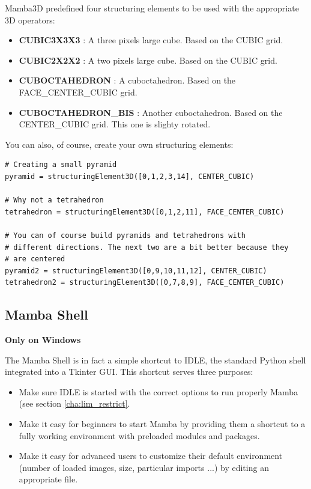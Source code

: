 \documentclass[a4paper,10pt,oneside]{article}
\begin{document}

Mamba3D predefined four structuring elements to be used with the appropriate
3D operators:

\begin{itemize}
\item \textbf{CUBIC3X3X3} : A three pixels large cube. Based on the CUBIC grid.
\item \textbf{CUBIC2X2X2} : A two pixels large cube. Based on the CUBIC grid.
\item \textbf{CUBOCTAHEDRON} : A cuboctahedron. Based on the
FACE\_CENTER\_CUBIC grid.
\item \textbf{CUBOCTAHEDRON\_BIS} : Another cuboctahedron. Based on the
CENTER\_CUBIC grid. This one is slighty rotated.
\end{itemize}

You can also, of course, create your own structuring elements:

\lstset{language=Python}
\begin{lstlisting}
# Creating a small pyramid
pyramid = structuringElement3D([0,1,2,3,14], CENTER_CUBIC)

# Why not a tetrahedron
tetrahedron = structuringElement3D([0,1,2,11], FACE_CENTER_CUBIC)

# You can of course build pyramids and tetrahedrons with
# different directions. The next two are a bit better because they
# are centered
pyramid2 = structuringElement3D([0,9,10,11,12], CENTER_CUBIC)
tetrahedron2 = structuringElement3D([0,7,8,9], FACE_CENTER_CUBIC)
\end{lstlisting}

\subsection{Mamba Shell}
\label{cha:mamba_shell}

\textbf{Only on Windows}

The Mamba Shell is in fact a simple shortcut to IDLE, the standard Python shell
integrated into a Tkinter GUI. This shortcut serves three purposes:

\begin{itemize}
\item Make sure IDLE is started with the correct options to run properly Mamba
(see section \ref{cha:lim_restrict}.
\item Make it easy for beginners to start Mamba by providing them a shortcut
to a fully working environment with preloaded modules and packages.
\item Make it easy for advanced users to customize their default environment
(number of loaded images, size, particular imports ...) by editing an appropriate
file.
\end{itemize}
\end{document}
